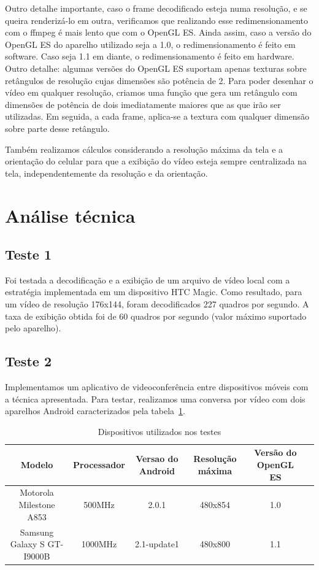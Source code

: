 \documentclass{acm_proc_article-sp}
\begin{document}
Outro detalhe importante, caso o frame decodificado esteja numa resolução, e se queira renderizá-lo em outra, verificamos que realizando esse redimensionamento com o ffmpeg é mais lento que com o OpenGL ES. Ainda assim, caso a versão do OpenGL ES do aparelho utilizado seja a 1.0, o redimensionamento é feito em software. Caso seja 1.1 em diante, o redimensionamento é feito em hardware. Outro detalhe: algumas versões do OpenGL ES suportam apenas texturas sobre retângulos de resolução cujas dimensões são potência de 2. Para poder desenhar o vídeo em qualquer resolução, criamos uma função que gera um retângulo com dimensões de potência de dois imediatamente maiores que as que irão ser utilizadas. Em seguida, a cada frame, aplica-se a textura com qualquer dimensão sobre parte desse retângulo.

Também realizamos cálculos considerando a resolução máxima da tela e a orientação do celular para que a exibição do vídeo esteja sempre centralizada na tela, independentemente da resolução e da orientação.

\section{Análise técnica}
\subsection{Teste 1}
Foi testada a decodificação e a exibição de um arquivo de vídeo local com a estratégia implementada em um dispositivo HTC Magic. Como resultado, para um vídeo de resolução 176x144, foram decodificados 227 quadros por segundo. A taxa de exibição obtida foi de 60 quadros por segundo (valor máximo suportado pelo aparelho).
\subsection{Teste 2}
Implementamos um aplicativo de videoconferência entre dispositivos móveis com a técnica apresentada. Para testar, realizamos uma conversa por vídeo com dois aparelhos Android caracterizados pela tabela~\ref{tabela_dispositivos}.
\begin{table}
\centering
\caption{Dispositivos utilizados nos testes}
\label{tabela_dispositivos}
\begin{tabular}{|c|c|c|c|c|l} \hline
Modelo&Processador&Versao do Android&Resolução máxima&Versão do OpenGL ES\\ \hline
Motorola Milestone A853&500MHz&2.0.1&480x854&1.0\\ \hline
Samsung Galaxy S GT-I9000B&1000MHz&2.1-update1&480x800&1.1\\
\hline\end{tabular}
\end{table}
\end{document}
